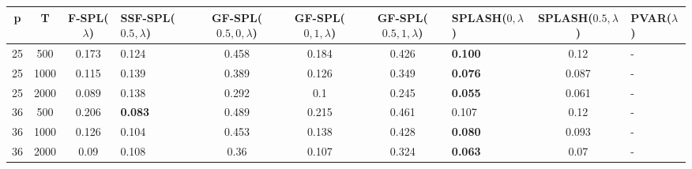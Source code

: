 \begin{tabular}{ccclccclcl}
\hline
  p  &  T   &  F-SPL($\lambda$)  & SSF-SPL($0.5, \lambda$)   &  GF-SPL($0.5, 0, \lambda$)  &  GF-SPL($0, 1, \lambda$)  &  GF-SPL($0.5, 1, \lambda$)  & SPLASH($0, \lambda$)   &  SPLASH($0.5, \lambda$)  & PVAR($\lambda$)   \\
\hline
 25  & 500  &       0.173        & 0.124                     &            0.458            &           0.184           &            0.426            & \textbf{0.100}         &           0.12           & -                 \\
 25  & 1000 &       0.115        & 0.139                     &            0.389            &           0.126           &            0.349            & \textbf{0.076}         &          0.087           & -                 \\
 25  & 2000 &       0.089        & 0.138                     &            0.292            &            0.1            &            0.245            & \textbf{0.055}         &          0.061           & -                 \\
 36  & 500  &       0.206        & \textbf{0.083}            &            0.489            &           0.215           &            0.461            & 0.107                  &           0.12           & -                 \\
 36  & 1000 &       0.126        & 0.104                     &            0.453            &           0.138           &            0.428            & \textbf{0.080}         &          0.093           & -                 \\
 36  & 2000 &        0.09        & 0.108                     &            0.36             &           0.107           &            0.324            & \textbf{0.063}         &           0.07           & -                 \\
\hline
\end{tabular}